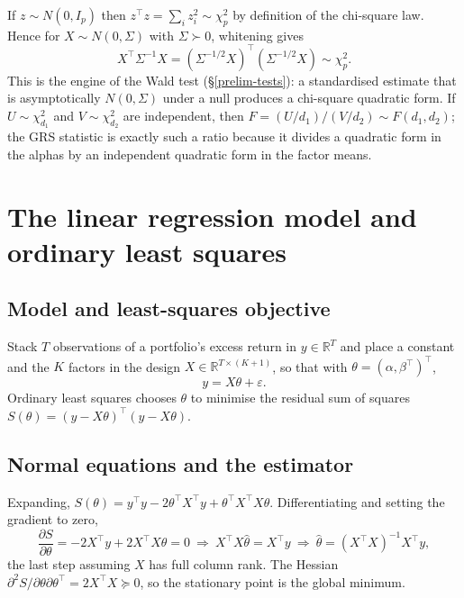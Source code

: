 If $z\sim N(0,I_p)$ then $z^{\top}z=\sum_i z_i^2\sim\chi^2_p$ by
definition of the chi-square law. Hence for $X\sim N(0,\Sigma)$ with
$\Sigma\succ 0$, whitening gives
\begin{equation}\label{eq:chisq}
X^{\top}\Sigma^{-1}X=(\Sigma^{-1/2}X)^{\top}(\Sigma^{-1/2}X)\sim\chi^2_p .
\end{equation}
This is the engine of the Wald test (\S\ref{prelim-tests}): a standardised
estimate that is asymptotically $N(0,\Sigma)$ under a null produces a
chi-square quadratic form. If $U\sim\chi^2_{d_1}$ and $V\sim\chi^2_{d_2}$
are independent, then $F=(U/d_1)/(V/d_2)\sim F(d_1,d_2)$; the GRS statistic
is exactly such a ratio because it divides a quadratic form in the alphas
by an independent quadratic form in the factor means.

\section{The linear regression model and ordinary least squares}\label{prelim-ols}

\subsection{Model and least-squares objective}

Stack $T$ observations of a portfolio's excess return in $y\in\mathbb{R}^T$
and place a constant and the $K$ factors in the design
$X\in\mathbb{R}^{T\times(K+1)}$, so that with
$\theta=(\alpha,\beta^{\top})^{\top}$,
\begin{equation}
y=X\theta+\varepsilon .
\end{equation}
Ordinary least squares chooses $\theta$ to minimise the residual sum of
squares $S(\theta)=(y-X\theta)^{\top}(y-X\theta)$.

\subsection{Normal equations and the estimator}

Expanding,
$S(\theta)=y^{\top}y-2\theta^{\top}X^{\top}y+\theta^{\top}X^{\top}X\theta$.
Differentiating and setting the gradient to zero,
\begin{equation}
\frac{\partial S}{\partial\theta}=-2X^{\top}y+2X^{\top}X\theta=0
\ \Longrightarrow\ X^{\top}X\hat\theta=X^{\top}y
\ \Longrightarrow\ \hat\theta=(X^{\top}X)^{-1}X^{\top}y,
\end{equation}
the last step assuming $X$ has full column rank. The Hessian
$\partial^2 S/\partial\theta\partial\theta^{\top}=2X^{\top}X\succeq 0$, so
the stationary point is the global minimum.

